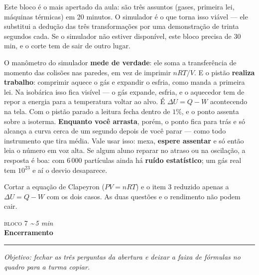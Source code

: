 \documentclass[11pt,a4paper]{article}
\newcommand{\bloco}[3]{%
  \needspace{7\baselineskip}
  \vspace{1.8em}
  {\scshape\color{vinho}bloco #1}\hfill
    {\small\itshape\color{grafite}\textasciitilde\,#3 min}\\[0.1em]
  {\Large\bfseries #2}\\[-0.55em]
  {\color{black!30}\rule{\linewidth}{0.5pt}}
  \par\nobreak\smallskip
}
\newcommand{\objetivo}[1]{{\itshape\color{grafite}Objetivo: #1}\par\smallskip}
\begin{document}
\begin{obs}
Este bloco \'e o mais apertado da aula: s\~ao tr\^es assuntos (gases, primeira
lei, m\'aquinas t\'ermicas) em 20 minutos. O simulador \'e o que torna isso
vi\'avel --- ele substitui a dedu\c{c}\~ao das tr\^es transforma\c{c}\~oes por uma
demonstra\c{c}\~ao de trinta segundos cada. Se o simulador n\~ao estiver
dispon\'ivel, este bloco precisa de 30 min, e o corte tem de sair de outro
lugar.

\medskip
O man\^ometro do simulador \textbf{mede de verdade}: ele soma a
transfer\^encia de momento das colis\~oes nas paredes, em vez de imprimir
$nRT/V$. E o pist\~ao \textbf{realiza trabalho}: comprimir aquece o g\'as e
expandir o esfria, como manda a primeira lei. Na isob\'arica isso fica
vis\'ivel --- o g\'as expande, esfria, e o aquecedor tem de repor a energia
para a temperatura voltar ao alvo. \'E $\Delta U = Q - W$ acontecendo na
tela. Com o pist\~ao parado a leitura fecha dentro de $1\%$, e o ponto
assenta sobre a isoterma. \textbf{Enquanto voc\^e arrasta}, por\'em, o ponto
fica para tr\'as e s\'o alcan\c{c}a a curva cerca de um segundo depois de
voc\^e parar --- como todo instrumento que tira m\'edia. Vale usar isso:
mexa, \textbf{espere assentar} e s\'o ent\~ao leia o n\'umero em voz alta.
Se algum aluno reparar no atraso ou na oscila\c{c}\~ao, a resposta \'e boa:
com 6\,000 part\'iculas ainda h\'a \textbf{ru\'ido estat\'istico}; um g\'as real
tem $10^{23}$ e a\'i o desvio desaparece.
\end{obs}

\begin{corte}
Cortar a equa\c{c}\~ao de Clapeyron ($PV = nRT$) e o item 3 reduzido apenas a
$\Delta U = Q - W$ com os dois casos. As duas quest\~oes e o rendimento
n\~ao podem cair.
\end{corte}

\bloco{7}{Encerramento}{5}

\objetivo{fechar as tr\^es perguntas da abertura e deixar a faixa de
f\'ormulas no quadro para a turma copiar.}
\end{document}
